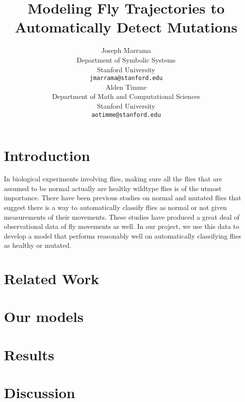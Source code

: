 \documentclass{article} %
\title{Modeling Fly Trajectories to Automatically Detect Mutations}
\author{
Joseph Marrama \\
Department of Symbolic Systems\\
Stanford University\\
\texttt{jmarrama@stanford.edu} \\
\And
Alden Timme \\
Department of Math and Computational Sciences \\
Stanford University \\
\texttt{aotimme@stanford.edu} \\
}
\begin{document}
\maketitle




\section{Introduction}

In biological experiments involving flies, making sure all the flies that are assumed to be normal actually are healthy wildtype flies is of the utmost importance. There have been previous studies on normal and mutated flies that suggest there is a way to automatically classify flies as normal or not given measurements of their movements. These studies have produced a great deal of observational data of fly movements as well. In our project, we use this data to develop a model that performs reasonably well on automatically classifying flies as healthy or mutated.


\section{Related Work}


\section{Our models}




\section{Results}


\section{Discussion}
\end{document}
